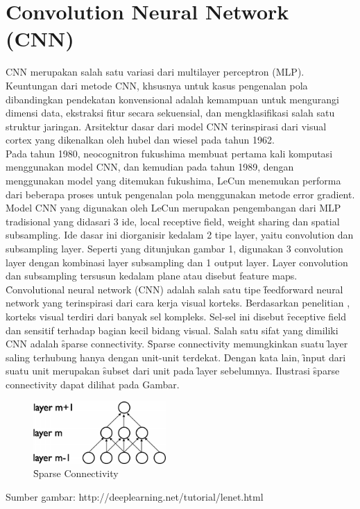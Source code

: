 \section{Convolution Neural Network (CNN)}
CNN merupakan salah satu variasi dari multilayer perceptron (MLP). Keuntungan dari metode CNN, khsusnya untuk kasus pengenalan pola dibandingkan pendekatan konvensional adalah kemampuan untuk mengurangi dimensi data, ekstraksi fitur secara sekuensial, dan mengklasifikasi salah satu struktur jaringan. Arsitektur dasar dari model CNN terinspirasi dari visual cortex yang dikenalkan oleh hubel dan wiesel pada tahun 1962.\\
Pada tahun 1980, neocognitron fukushima membuat pertama kali komputasi menggunakan model CNN, dan kemudian pada tahun 1989, dengan menggunakan model yang ditemukan fukushima, LeCun menemukan performa dari beberapa proses untuk pengenalan pola menggunakan metode error gradient.\\
Model CNN yang digunakan oleh LeCun merupakan pengembangan dari MLP tradisional yang didasari 3 ide, local receptive field, weight sharing dan spatial subsampling. Ide dasar ini diorganisir kedalam 2 tipe layer, yaitu convolution dan subsampling layer. Seperti yang ditunjukan gambar 1, digunakan 3 convolution layer dengan kombinasi layer subsampling dan 1 output layer. Layer convolution dan subsampling tersusun kedalam plane atau disebut feature maps.\\
\f{Convolutional neural network} (CNN) adalah salah satu tipe \f{feedforward neural network} yang terinspirasi dari cara kerja visual korteks. Berdasarkan penelitian , korteks visual terdiri dari banyak sel kompleks. Sel-sel ini disebut \f{receptive field} dan sensitif terhadap bagian kecil bidang visual. Salah satu sifat yang dimiliki CNN adalah \f{sparse connectivity}. \f{Sparse connectivity} memungkinkan suatu \f{layer} saling terhubung hanya dengan unit-unit terdekat. Dengan kata lain, \f{input} dari suatu unit merupakan \f{subset} dari unit pada \f{layer} sebelumnya. Ilustrasi \f{sparse connectivity} dapat dilihat pada Gambar.

\begin{figure}
	\centering
	\includegraphics[width=0.45\textwidth,height=0.2\textwidth]
	{pics/sparse.png}
	\caption{\f{Sparse Connectivity}}
	\label{fig:sparse}
\end{figure}
\vspace{-1.2cm}
\begin{center}
	{\small Sumber gambar: http://deeplearning.net/tutorial/lenet.html}
\end{center}

